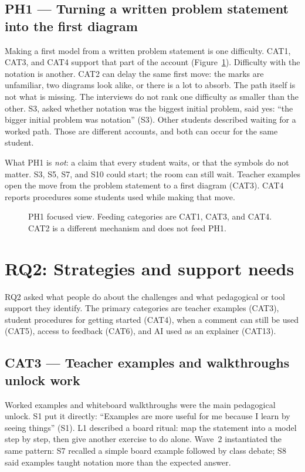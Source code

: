 \subsection{PH1 --- Turning a written problem statement into the first diagram}
\label{sec:ph1}

Making a first model from a written problem statement is one difficulty. CAT1, CAT3, and CAT4 support that part of the account (Figure~\ref{fig:ph1}). Difficulty with the notation is another. CAT2 can delay the same first move: the marks are unfamiliar, two diagrams look alike, or there is a lot to absorb. The path itself is not what is missing. The interviews do not rank one difficulty as smaller than the other. S3, asked whether notation was the biggest initial problem, said yes: ``the bigger initial problem was notation'' (S3). Other students described waiting for a worked path. Those are different accounts, and both can occur for the same student.

What PH1 is \emph{not}: a claim that every student waits, or that the symbols do not matter. S3, S5, S7, and S10 could start; the room can still wait. Teacher examples open the move from the problem statement to a first diagram (CAT3). CAT4 reports procedures some students used while making that move.

\begin{figure}[htbp]
\centering

\caption{PH1 focused view. Feeding categories are CAT1, CAT3, and CAT4. CAT2 is a different mechanism and does not feed PH1.}
\label{fig:ph1}
\end{figure}

\section{RQ2: Strategies and support needs}
\label{sec:findings_rq2}

RQ2 asked what people do about the challenges and what pedagogical or tool support they identify. The primary categories are teacher examples (CAT3), student procedures for getting started (CAT4), when a comment can still be used (CAT5), access to feedback (CAT6), and AI used as an explainer (CAT13).

\subsection{CAT3 --- Teacher examples and walkthroughs unlock work}
\label{sec:cat3}

Worked examples and whiteboard walkthroughs were the main pedagogical unlock. S1 put it directly: ``Examples are more useful for me because I learn by seeing things'' (S1). L1 described a board ritual: map the statement into a model step by step, then give another exercise to do alone. Wave~2 instantiated the same pattern: S7 recalled a simple board example followed by class debate; S8 said examples taught notation more than the expected answer.

